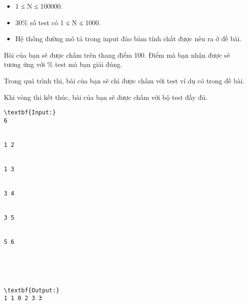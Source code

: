 \begin{itemize}
	\item     1 ≤ N ≤ 100000.   
	\item     30\% số test có 1 ≤ N ≤ 1000.   
	\item     Hệ thống đường mô tả trong input đảo bảm tính chất được nêu ra ở đề bài.   
\end{itemize}
Bài của bạn sẽ được chấm trên thang điểm 100. Điểm mà bạn nhận được sẽ tương ứng với \% test mà bạn giải đúng.  

   Trong quá trình thi, bài của bạn sẽ chỉ được chấm với test ví dụ có trong đề bài.  

   Khi vòng thi kết thúc, bài của bạn sẽ được chấm với bộ test đầy đủ.
\begin{verbatim}
\textbf{Input:}
6


1 2


1 3


3 4


3 5


5 6





\textbf{Output:}
1 1 0 2 3 3
\end{verbatim}